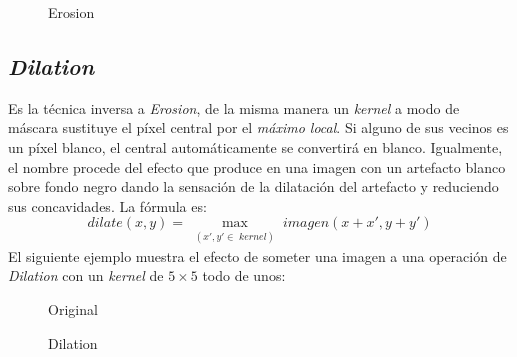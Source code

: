 \begin{figure}[H]
  \centering \setlength\fboxsep{0pt} \setlength\fboxrule{0.5pt}
  \caption{Erosion}
\end{figure}


\subsection{\emph{Dilation}}\label{tecnica:dilation}
Es la técnica inversa a \emph{Erosion}, de la misma manera un
\emph{kernel} a modo de máscara sustituye el píxel central por el
\emph{máximo local}. Si alguno de sus vecinos es un píxel blanco, el
central automáticamente se convertirá en blanco. Igualmente, el nombre
procede del efecto que produce en una imagen con un artefacto blanco
sobre fondo negro dando la sensación de la dilatación del artefacto y
reduciendo sus concavidades. La fórmula es:
\begin{equation*}
  dilate(x, y) = \max_{\substack{(x', y' \in \;kernel)}} imagen(x + x', y + y')
\end{equation*}
El siguiente ejemplo muestra el efecto de someter una imagen a una
operación de \emph{Dilation} con un \emph{kernel} de $5 \times 5$ todo
de unos:

\begin{figure}[H]
  \caption{Original}
  \centering \setlength\fboxsep{0pt} \setlength\fboxrule{0.5pt}
\end{figure}

\begin{figure}[H]
  \centering \setlength\fboxsep{0pt} \setlength\fboxrule{0.5pt}
  \caption{Dilation}
\end{figure}

